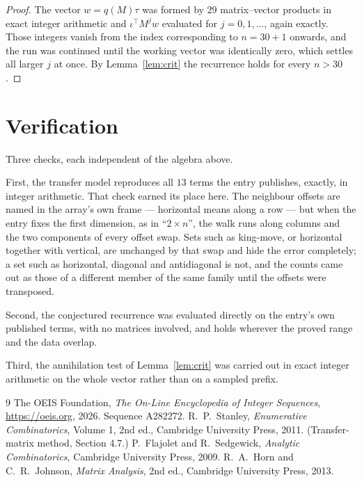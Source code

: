 \documentclass[11pt,a4paper]{article}
\theoremstyle{plain}
\theoremstyle{definition}
\begin{document}
\begin{proof}
The vector $w=q(M)\tau$ was formed by $29$ matrix--vector products in exact integer
arithmetic and $\iota^{\!\top}M^{j}w$ evaluated for $j=0,1,\dots$, again exactly. Those
integers vanish from the index corresponding to $n=30+1$ onwards, and the run was
continued until the working vector was identically zero, which settles all larger $j$ at once.
By Lemma~\ref{lem:crit} the recurrence holds for every $n>30$.
\end{proof}

\section{Verification}

Three checks, each independent of the algebra above.

First, the transfer model reproduces all $13$ terms the entry publishes, exactly, in
integer arithmetic. That check earned its place here. The neighbour offsets are named in the
array's own frame --- horizontal means along a row --- but when the entry fixes the first
dimension, as in ``$2\times n$'', the walk runs along columns and the two components of every
offset swap. Sets such as king-move, or horizontal together with vertical, are unchanged by
that swap and hide the error completely; a set such as horizontal, diagonal and antidiagonal
is not, and the counts came out as those of a different member of the same family until the
offsets were transposed.

Second, the conjectured recurrence was evaluated directly on the entry's own published terms,
with no matrices involved, and holds wherever the proved range and the data overlap.

Third, the annihilation test of Lemma~\ref{lem:crit} was carried out in exact integer
arithmetic on the whole vector rather than on a sampled prefix.

\begin{thebibliography}{9}
 The OEIS Foundation, \emph{The On-Line Encyclopedia of Integer
Sequences}, \url{https://oeis.org}, 2026. Sequence A282272.
 R.~P.~Stanley, \emph{Enumerative Combinatorics}, Volume 1, 2nd ed.,
Cambridge University Press, 2011. (Transfer-matrix method, Section 4.7.)
 P.~Flajolet and R.~Sedgewick, \emph{Analytic Combinatorics}, Cambridge
University Press, 2009.
 R.~A.~Horn and C.~R.~Johnson, \emph{Matrix Analysis}, 2nd ed., Cambridge
University Press, 2013.
\end{thebibliography}
\end{document}
